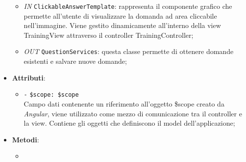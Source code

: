 \begin{itemize}
\begin{itemize}
		\item \textit{IN} \texttt{ClickableAnswerTemplate}: rappresenta il componente grafico che permette all'utente di visualizzare la domanda ad area cliccabile nell'immagine. Viene gestito dinamicamente all'interno della view TrainingView attraverso il controller TrainingController;  
		\item \textit{OUT} \texttt{QuestionServices}: questa classe permette di ottenere domande esistenti e salvare nuove domande;
	\end{itemize}
	\item \textbf{Attributi}:
	\begin{itemize}
		\item \texttt{-} \texttt{\$scope: \$scope} \\
		Campo dati contenente un riferimento all’oggetto \$scope creato da \textit{Angular}, viene utilizzato come mezzo di comunicazione tra il controller e la view. Contiene gli oggetti che definiscono il model dell’applicazione;
	\end{itemize}
	\item \textbf{Metodi}:
	\begin{itemize}
		\item 
	\end{itemize}
\end{itemize}

